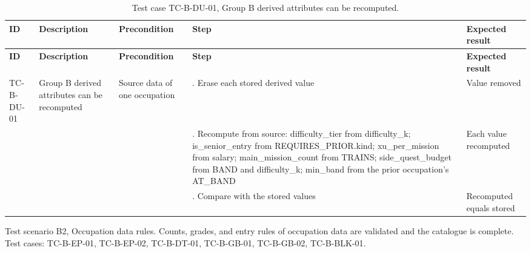 {\small
\begin{longtable}{|>{\raggedright\arraybackslash}p{}|>{\raggedright\arraybackslash}p{}|>{\raggedright\arraybackslash}p{}|>{\raggedright\arraybackslash}p{}|>{\raggedright\arraybackslash}p{}|}
\caption{Test case TC-B-DU-01, Group B derived attributes can be recomputed.} \\
\hline
\textbf{ID} & \textbf{Description} & \textbf{Precondition} & \textbf{Step} & \textbf{Expected result} \\ \hline
\endfirsthead
\hline
\textbf{ID} & \textbf{Description} & \textbf{Precondition} & \textbf{Step} & \textbf{Expected result} \\ \hline
\endhead
TC-B-DU-01 & Group B derived attributes can be recomputed & Source data of one occupation & 1. Erase each stored derived value & Value removed \\ \hline
 &  &  & 2. Recompute from source: difficulty\_tier from difficulty\_k; is\_senior\_entry from REQUIRES\_PRIOR.kind; xu\_per\_mission from salary; main\_mission\_count from TRAINS; side\_quest\_budget from BAND and difficulty\_k; min\_band from the prior occupation's AT\_BAND & Each value recomputed \\ \hline
 &  &  & 3. Compare with the stored values & Recomputed equals stored \\ \hline
\end{longtable}
}

Test scenario B2, Occupation data rules. Counts, grades, and entry rules of occupation data are validated and the catalogue is complete. Test cases: TC-B-EP-01, TC-B-EP-02, TC-B-DT-01, TC-B-GB-01, TC-B-GB-02, TC-B-BLK-01.

